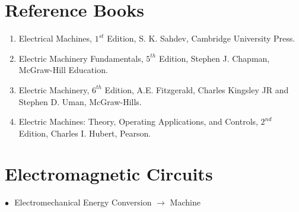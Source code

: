 \documentclass[a4aper,12pt]{report}
\begin{document}
\chapter*{Reference Books}
\vspace*{-2.7cm}
\thispagestyle{empty}
\begin{enumerate}
    \item Electrical Machines, $1^{st}$ Edition, S. K. Sahdev, Cambridge University Press.
    \item Electric Machinery Fundamentals, $5^{th}$ Edition, Stephen J. Chapman, McGraw-Hill Education.
    \item Electric Machinery, $6^{th}$ Edition, A.E. Fitzgerald, Charles Kingsley JR and Stephen D. Uman, McGraw-Hills.
    \item Electric Machines: Theory, Operating Applications, and Controls, $2^{nd}$ Edition, Charles I. Hubert, Pearson.
\end{enumerate}
\tableofcontents 
\thispagestyle{empty}
\newpage
\setcounter{page}{1}
\chapter{Electromagnetic Circuits}
$\bullet\,\,$ Electromechanical Energy Conversion $\longrightarrow$ Machine
\end{document}
